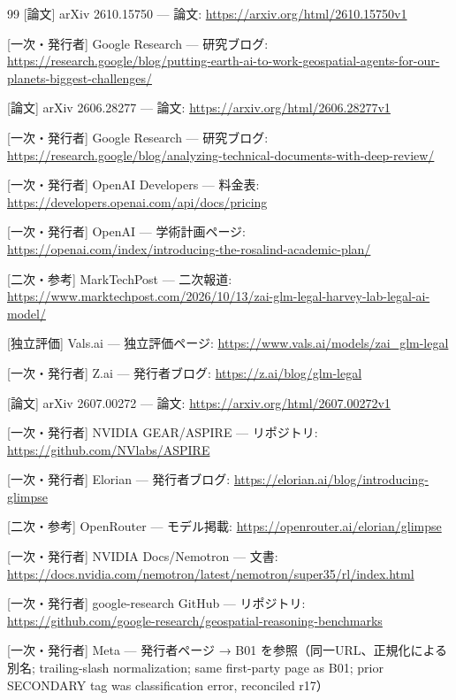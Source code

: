\documentclass[lualatex,a4paper,10pt]{jlreq}
\begin{document}
\begin{thebibliography}{99}
 [論文] arXiv 2610.15750 — 論文: \url{https://arxiv.org/html/2610.15750v1}

 [一次・発行者] Google Research — 研究ブログ: \url{https://research.google/blog/putting-earth-ai-to-work-geospatial-agents-for-our-planets-biggest-challenges/}

 [論文] arXiv 2606.28277 — 論文: \url{https://arxiv.org/html/2606.28277v1}

 [一次・発行者] Google Research — 研究ブログ: \url{https://research.google/blog/analyzing-technical-documents-with-deep-review/}

 [一次・発行者] OpenAI Developers — 料金表: \url{https://developers.openai.com/api/docs/pricing}

 [一次・発行者] OpenAI — 学術計画ページ: \url{https://openai.com/index/introducing-the-rosalind-academic-plan/}

 [二次・参考] MarkTechPost — 二次報道: \url{https://www.marktechpost.com/2026/10/13/zai-glm-legal-harvey-lab-legal-ai-model/}

 [独立評価] Vals.ai — 独立評価ページ: \url{https://www.vals.ai/models/zai_glm-legal}

 [一次・発行者] Z.ai — 発行者ブログ: \url{https://z.ai/blog/glm-legal}

 [論文] arXiv 2607.00272 — 論文: \url{https://arxiv.org/html/2607.00272v1}

 [一次・発行者] NVIDIA GEAR/ASPIRE — リポジトリ: \url{https://github.com/NVlabs/ASPIRE}

 [一次・発行者] Elorian — 発行者ブログ: \url{https://elorian.ai/blog/introducing-glimpse}

 [二次・参考] OpenRouter — モデル掲載: \url{https://openrouter.ai/elorian/glimpse}

 [一次・発行者] NVIDIA Docs/Nemotron — 文書: \url{https://docs.nvidia.com/nemotron/latest/nemotron/super35/rl/index.html}

 [一次・発行者] google-research GitHub — リポジトリ: \url{https://github.com/google-research/geospatial-reasoning-benchmarks}

 [一次・発行者] Meta — 発行者ページ → B01 を参照（同一URL、正規化による別名; trailing-slash normalization; same first-party page as B01; prior SECONDARY tag was classification error, reconciled r17）


\end{thebibliography}
\end{document}
